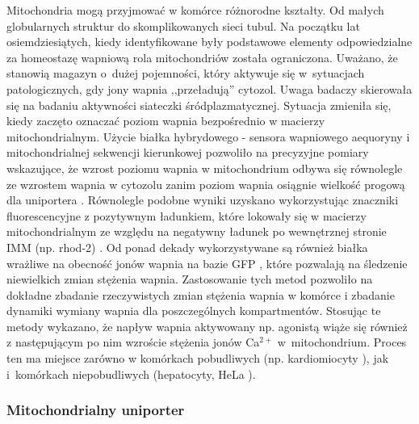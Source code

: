 Mitochondria mogą przyjmować w komórce różnorodne kształty. Od małych globularnych struktur do skomplikowanych sieci tubul. Na początku lat osiemdziesiątych, kiedy identyfikowane były podstawowe elementy odpowiedzialne za homeostazę wapniową rola mitochondriów została ograniczona. Uważano, że stanowią magazyn o~dużej pojemności, który aktywuje się w~sytuacjach patologicznych, gdy jony wapnia ,,przeładują'' cytozol. Uwaga badaczy skierowała się na badaniu aktywności siateczki śródplazmatycznej. Sytuacja zmieniła się, kiedy zaczęto oznaczać poziom wapnia bezpośrednio w macierzy mitochondrialnym. Użycie białka hybrydowego - sensora wapniowego aequoryny i mitochondrialnej sekwencji kierunkowej pozwoliło na precyzyjne pomiary wskazujące, że wzrost poziomu wapnia w mitochondrium odbywa się równolegle ze wzrostem wapnia w cytozolu zanim poziom wapnia osiągnie wielkość progową dla uniportera \cite{Rizzuto2000}. Równolegle podobne wyniki uzyskano wykorzystując znaczniki fluorescencyjne z pozytywnym ładunkiem, które lokowały się w macierzy mitochondrialnym ze względu na negatywny ładunek po wewnętrznej stronie IMM (np. rhod-2) \cite{Jou1996}. Od ponad dekady wykorzystywane są również białka wrażliwe na obecność jonów wapnia na bazie GFP \cite{Nagai2001}, które pozwalają na śledzenie niewielkich zmian stężenia wapnia. Zastosowanie tych metod pozwoliło na dokładne zbadanie rzeczywistych zmian stężenia wapnia w komórce i zbadanie dynamiki wymiany wapnia dla poszczególnych kompartmentów. Stosując te metody wykazano, że napływ wapnia aktywowany np. agonistą wiąże się również z następującym po nim wzroście stężenia jonów Ca$^{2+}$ w~mitochondrium. Proces ten ma miejsce zarówno w komórkach pobudliwych (np. kardiomiocyty \cite{Trollinger1997}), jak i~komórkach niepobudliwych (hepatocyty, HeLa \cite{Rizzuto1994,Thomas1991}).


\subsubsection{Mitochondrialny uniporter}
\label{ss:uniporter}

